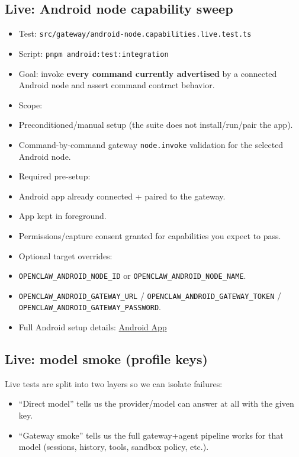\subsection{Live: Android node capability sweep}


\begin{itemize}
  \item Test: \texttt{src/gateway/android-node.capabilities.live.test.ts}
  \item Script: \texttt{pnpm android:test:integration}
  \item Goal: invoke \textbf{every command currently advertised} by a connected Android node and assert command contract behavior.
  \item Scope:
  \item Preconditioned/manual setup (the suite does not install/run/pair the app).
  \item Command-by-command gateway \texttt{node.invoke} validation for the selected Android node.
  \item Required pre-setup:
  \item Android app already connected + paired to the gateway.
  \item App kept in foreground.
  \item Permissions/capture consent granted for capabilities you expect to pass.
  \item Optional target overrides:
  \item \texttt{OPENCLAW\_ANDROID\_NODE\_ID} or \texttt{OPENCLAW\_ANDROID\_NODE\_NAME}.
  \item \texttt{OPENCLAW\_ANDROID\_GATEWAY\_URL} / \texttt{OPENCLAW\_ANDROID\_GATEWAY\_TOKEN} / \texttt{OPENCLAW\_ANDROID\_GATEWAY\_PASSWORD}.
  \item Full Android setup details: \href{/platforms/android}{Android App}
\end{itemize}


\subsection{Live: model smoke (profile keys)}


Live tests are split into two layers so we can isolate failures:

\begin{itemize}
  \item “Direct model” tells us the provider/model can answer at all with the given key.
  \item “Gateway smoke” tells us the full gateway+agent pipeline works for that model (sessions, history, tools, sandbox policy, etc.).
\end{itemize}


